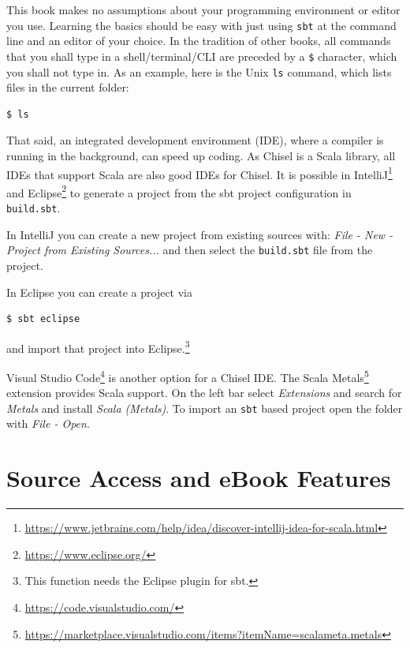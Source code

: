 \documentclass[%
    10pt,
    headinclude, footexclude,
    openright, %
    notitlepage,
    cleardoubleempty,
    headsepline,
    pointlessnumbers,
    bibtotoc, idxtotoc,
    ]{scrbook}
\newcommand{\code}[1]{{\small{\texttt{#1}}}}
\newcommand{\myref}[2]{\href{#1}{#2}}
\renewcommand{\myref}[2]{{#2}{\footnote{\url{#1}}}}
\begin{document}
This book makes no assumptions about your programming environment or editor you use.
Learning the basics should be easy with just using \code{sbt} at the command line
and an editor of your choice. In the tradition of other books, all commands that you
shall type in a shell/terminal/CLI are preceded by a \code{\$} character, which you
shall not type in. As an example, here is the Unix \code{ls} command, which lists files in
the current folder:

\begin{verbatim}
$ ls
\end{verbatim}

That said, an integrated development environment (IDE), where a compiler is running in
the background, can speed up coding. As Chisel is a Scala library, all IDEs
that support Scala are also good IDEs for Chisel.
It is possible in
\myref{https://www.jetbrains.com/help/idea/discover-intellij-idea-for-scala.html}{IntelliJ} and
 \myref{https://www.eclipse.org/}{Eclipse}
to generate a project from the sbt project configuration in \code{build.sbt}.

In IntelliJ you can create a new project from existing sources with:
\emph{File - New - Project from Existing Sources...} and then select the \code{build.sbt}
file from the project.

In Eclipse you can create a project via
\begin{verbatim}
$ sbt eclipse
\end{verbatim}
and import that project into Eclipse.\footnote{This function needs the Eclipse plugin for sbt.}

\myref{https://code.visualstudio.com/}{Visual Studio Code} is another option for a Chisel IDE. 
The \myref{https://marketplace.visualstudio.com/items?itemName=scalameta.metals}{Scala Metals}
extension provides Scala support.
On the left bar select \emph{Extensions} and search for \emph{Metals} and install \emph{Scala (Metals)}.
To import an \code{sbt} based project open the folder with \emph{File - Open}. 



\section{Source Access and eBook Features}
\end{document}
